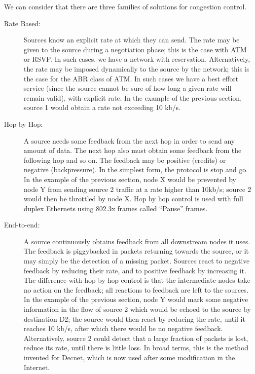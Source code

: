 We can consider that there are three families of solutions for
congestion control.
\begin{description}
        \item[Rate Based: ]  Sources know an explicit rate at which they can
        send. The rate may be given to the source during a negotiation
        phase;
        this is the case with ATM or RSVP. In such cases, we have a network
        with reservation. Alternatively, the rate may be imposed
        dynamically to the source by the network; this is the case
        for the ABR class of ATM. In such cases we have a best effort
        service (since the source cannot be sure of how long a given rate
        will remain valid), with explicit rate. In the example of the
        previous section, source 1 would obtain a rate not exceeding 10 kb/s.

        \item[Hop by Hop: ] A source needs some feedback from the next hop in
        order to send any amount of data. The next hop also must obtain some
        feedback from the following hop and so on. The feedback may be positive
        (credits) or negative (backpressure). In the simplest form, the
        protocol is stop and go. In the example of the
        previous section, node X would be prevented by node Y from sending
        source 2 traffic at a rate higher than 10kb/s; source 2 would then
        be throttled by node X. Hop by hop control is used
        with full duplex Ethernets using 802.3x frames called ``Pause''
        frames.

        \item[End-to-end:] A source continuously obtains feedback from all
        downstream nodes it uses.  The feedback is piggybacked in packets
        returning towards the source, or it may simply be the detection of
        a missing packet.  Sources react to negative feedback by reducing
        their rate, and to positive feedback by increasing it.  The
        difference with hop-by-hop control is that the intermediate nodes
        take no action on the feedback; all reactions to feedback are left
        to the sources.  In the example of the previous section, node Y
        would mark some negative information in the flow of source 2 which would be
        echoed to the source by destination D2; the source would then react
        by reducing the rate, until it reaches 10 kb/s, after which there
        would be no negative feedback. Alternatively, source 2 could detect
        that a large fraction of packets is lost, reduce its rate, until
        there is little loss. In broad terms, this is the method invented for
        Decnet, which is now used after some modification in the Internet.

\end{description}

